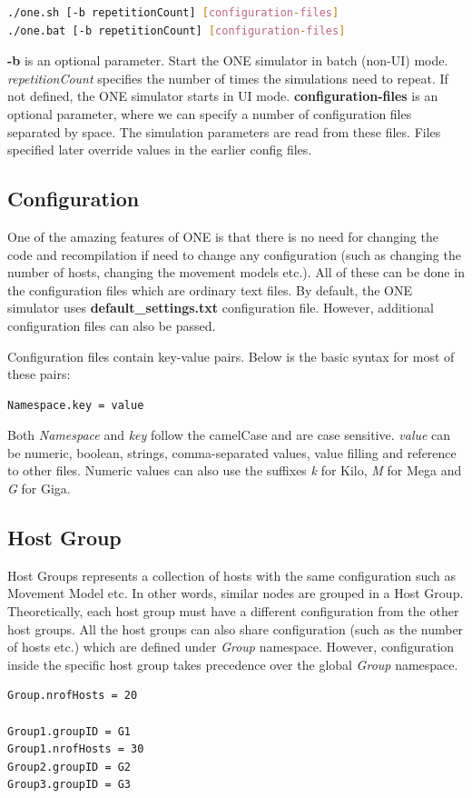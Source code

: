 \begin{lstlisting}[language=bash]
./one.sh [-b repetitionCount] [configuration-files]
./one.bat [-b repetitionCount] [configuration-files]
\end{lstlisting}

\textbf{-b} is an optional parameter. Start the ONE simulator in batch (non-UI) mode. \textit{repetitionCount} specifies the number of times the simulations need to repeat. If not defined, the ONE simulator starts in UI mode.\newline
\textbf{configuration-files} is an optional parameter, where we can specify a number of configuration files separated by space. The simulation parameters are read from these files. Files specified later override values in the earlier config files.\newline

\subsection{Configuration}
\label{one:configuration}
One of the amazing features of ONE is that there is no need for changing the code and recompilation if need to change any configuration (such as changing the number of hosts, changing the movement models etc.). All of these can be done in the configuration files which are ordinary text files. By default, the ONE simulator uses \textbf{default\_settings.txt} configuration file. However, additional configuration files can also be passed.

Configuration files contain key-value pairs. Below is the basic syntax for most of these pairs:
\begin{lstlisting}[language=bash]
Namespace.key = value
\end{lstlisting}

Both \textit{Namespace} and \textit{key} follow the camelCase and are case sensitive. \textit{value} can be numeric, boolean, strings, comma-separated values, value filling and reference to other files. Numeric values can also use the suffixes \textit{k} for Kilo, \textit{M} for Mega and \textit{G} for Giga.

\subsection{Host Group}
Host Groups represents a collection of hosts with the same configuration such as Movement Model etc. In other words, similar nodes are grouped in a Host Group. Theoretically, each host group must have a different configuration from the other host groups. All the host groups can also share configuration (such as the number of hosts etc.) which are defined under \textit{Group} namespace. However, configuration inside the specific host group takes precedence over the global \textit{Group} namespace.
\begin{lstlisting}[language=bash]
Group.nrofHosts = 20

Group1.groupID = G1
Group1.nrofHosts = 30
Group2.groupID = G2
Group3.groupID = G3
\end{lstlisting}

